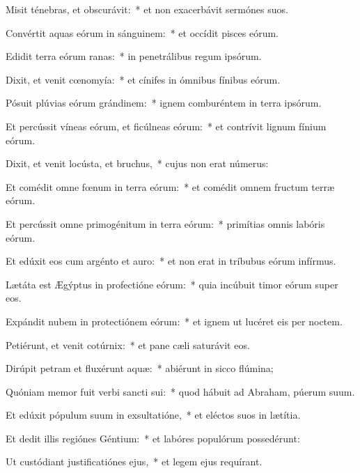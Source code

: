 
\item Misit ténebras, et obscurávit:~* et non exacerbávit sermónes suos.

\item Convértit aquas eórum in sánguinem:~* et occídit pisces eórum.

\item Edidit terra eórum ranas:~* in penetrálibus regum ipsórum.

\item Dixit, et venit cœnomyía:~* et cínifes in ómnibus fínibus eórum.

\item Pósuit plúvias eórum grándinem:~* ignem comburéntem in terra ipsórum.

\item Et percússit víneas eórum, et ficúlneas eórum:~* et contrívit lignum fínium eórum.

\item Dixit, et venit locústa, et bruchus,~* cujus non erat númerus:

\item Et comédit omne fœnum in terra eórum:~* et comédit omnem fructum terræ eórum.

\item Et percússit omne primogénitum in terra eórum:~* primítias omnis labóris eórum.

\item Et edúxit eos cum argénto et auro:~* et non erat in tríbubus eórum infírmus.

\item Lætáta est Ægýptus in profectióne eórum:~* quia incúbuit timor eórum super eos.

\item Expándit nubem in protectiónem eórum:~* et ignem ut lucéret eis per noctem.

\item Petiérunt, et venit cotúrnix:~* et pane cæli saturávit eos.

\item Dirúpit petram et fluxérunt aquæ:~* abiérunt in sicco flúmina;

\item Quóniam memor fuit verbi sancti sui:~* quod hábuit ad Abraham, púerum suum.

\item Et edúxit pópulum suum in exsultatióne,~* et eléctos suos in lætítia.

\item Et dedit illis regiónes Géntium:~* et labóres populórum possedérunt:

\item Ut custódiant justificatiónes ejus,~* et legem ejus requírant.